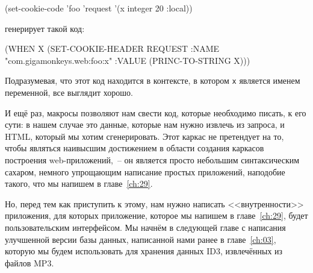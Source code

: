 \begin{myverb}
  (set-cookie-code 'foo 'request '(x integer 20 :local))
\end{myverb}

\noindent{}генерирует такой код:

\begin{myverb}
  (WHEN X
    (SET-COOKIE-HEADER REQUEST
      :NAME "com.gigamonkeys.web:foo:x"
      :VALUE (PRINC-TO-STRING X)))
\end{myverb}

Подразумевая, что этот код находится в контексте, в котором \lstinline{x} является именем
переменной, все выглядит хорошо.

И ещё раз, макросы позволяют нам свести код, которые необходимо писать, к его сути: в
нашем случае это данные, которые нам нужно извлечь из запроса, и HTML, который мы хотим
сгенерировать. Этот каркас не претендует на то, чтобы являться наивысшим достижением в
области создания каркасов построения web-приложений,~-- он является просто небольшим
синтаксическим сахаром, немного упрощающим написание простых приложений, наподобие такого,
что мы напишем в главе~\ref{ch:29}.

Но, перед тем как приступить к этому, нам нужно написать <<внутренности>> приложения, для
которых приложение, которое мы напишем в главе~\ref{ch:29}, будет пользовательским
интерфейсом. Мы начнём в следующей главе с написания улучшенной версии базы данных,
написанной нами ранее в главе~\ref{ch:03}, которую мы будем использовать для хранения
данных ID3, извлечённых из файлов MP3.

